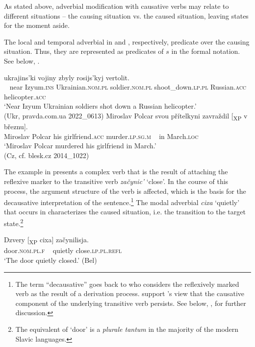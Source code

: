 \documentclass[output=paper]{langscibook}
\begin{document}
\noindent As stated above, adverbial modification with causative verbs may relate to different situations -- the causing situation vs. the caused situation, leaving states for the moment aside.

The local and temporal adverbial in  and , respectively, predicate over the causing situation. Thus, they are represented as predicates of $s$ in the formal notation. See below, .

\ea%
    \label{ex:junghanns:24}
 ukrajins'ki vojiny zbyly rosijs'kyj vertolit.\\
  ~ near Izyum.\textsc{ins}  Ukrainian.\textsc{nom.pl} soldier.\textsc{nom.pl} shoot\_down.\textsc{lp.pl} Russian.\textsc{acc} helicopter.\textsc{acc}\\
    \glt ‘Near Izyum Ukrainian soldiers shot down a Russian helicopter.’ \\ \hfill(Ukr, pravda.com.ua 2022\_0613)
\ex%
    \label{ex:junghanns:25}
\gll Miroslav Polcar svou přítelkyni zavraždil [\textsubscript{XP} v březnu].\\
  Miroslav Polcar his girlfriend.\textsc{acc} murder.\textsc{lp.sg.m} ~ in March.\textsc{loc}\\
    \glt ‘Miroslav Polcar murdered his girlfriend in March.’ \\ \hfill(Cz, cf. blesk.cz 2014\_1022)
\z

\noindent The example in  presents a complex verb that is the result of attaching the reflexive marker to the transitive verb \textit{začynic’} ‘close’. In the course of this process, the argument structure of the verb is affected, which is the basis for the decausative interpretation of the sentence.\footnote{The term “decausative” goes back to \citet{Paduceva2003} who considers the reflexively marked verb as the result of a derivation process. \citet{Fehrmannetal2014} support \citeauthor{Paduceva2003}’s view that the causative component of the underlying transitive verb persists. See below, , for further discussion.} The modal adverbial \textit{cixa} ‘quietly’ that occurs in  characterizes the caused situation, i.e. the transition to the target state.\footnote{The equivalent of ‘door’ is a \textit{plurale tantum} in the majority of the modern Slavic languages.}

\ea%
    \label{ex:junghanns:26}
\gll Dzvery [\textsubscript{XP} cixa] začynilisja.\\
  door.\textsc{nom.pl.f} ~ quietly close.\textsc{lp.pl.refl}\\
    \glt ‘The door quietly closed.’ \hfill (Bel)
\z
\end{document}
